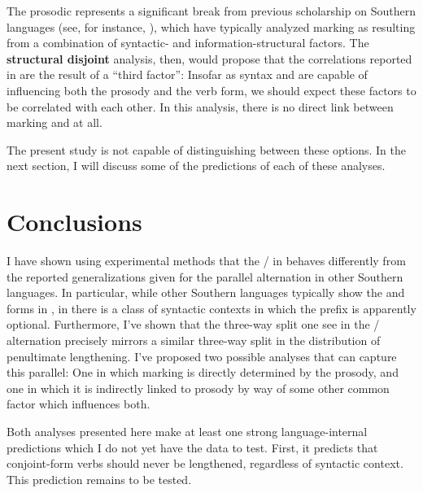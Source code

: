 \documentclass[output=paper 
,modfonts
,nonflat]{langsci/langscibook}
\begin{document}
The prosodic  represents a significant break from previous
scholarship on Southern  languages (see, for instance,
\citealt{Buell2005,ChengDowning2009}), which have typically analyzed 
marking as resulting from a combination of syntactic- and
information-structural factors. The \textbf{structural disjoint} analysis,
then, would propose that the correlations reported in
 are the result of a ``third factor'': Insofar
as syntax and  are capable of influencing both the prosody
and the verb form, we should expect these factors to be correlated with each
other. In this analysis, there is no direct link between  marking and
 at all.

The present study is not capable of distinguishing between these options. In
the next section, I will discuss some of the predictions of each of these
analyses.

\section{Conclusions}\label{sec:kusmer:conclusion}


I have shown using experimental methods that the \slash {} in
 behaves differently from the reported generalizations given for the
parallel alternation in other Southern  languages. In particular, while
other Southern  languages typically show the  and  forms
in , in  there is a class of syntactic
contexts in which the  prefix is apparently optional. Furthermore, I've
shown that the three-way split one see in the \slash {} alternation
precisely mirrors a similar three-way split in the distribution of penultimate
lengthening. I've proposed two possible analyses that can capture this
parallel: One in which  marking is directly determined by the prosody,
and one in which it is indirectly linked to prosody by way of some other common
factor which influences both.

Both analyses presented here make at least one strong language-internal
predictions which I do not yet have the data to test. First, it predicts that
conjoint-form verbs should never be lengthened, regardless of syntactic
context. This prediction remains to be tested.
\end{document}
